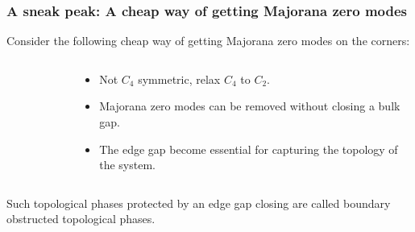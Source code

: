 \documentclass{beamer}
\renewcommand{\(}{\left(}
\renewcommand{\)}{\right)}
\renewcommand{\[}{\left[}
\renewcommand{\]}{\right]}
\begin{document}
\begin{frame}
    \frametitle{A sneak peak: A cheap way of getting Majorana zero modes}
    Consider the following cheap way of getting Majorana zero modes on the corners: 
    \begin{columns}
        \begin{column}{0.4\textwidth}
            \begin{figure}[]
                \centering
            \end{figure}
        \end{column}\pause
        \begin{column}{0.6\textwidth}
            \begin{itemize}
                \item Not $C_4$ symmetric, relax $C_4$ to $C_2$.\pause
                \item Majorana zero modes can be removed without closing a bulk gap. \pause
                \item The edge gap become essential for capturing the topology of the system. 
            \end{itemize}
        \end{column}
    \end{columns}\pause
    \begin{framed}
        Such topological phases protected by an edge gap closing are called boundary obstructed topological phases.
    \end{framed}
\end{frame}
\end{document}
